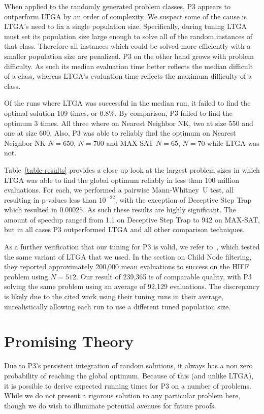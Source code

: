 \documentclass{sig-alternate}
\begin{document}
When applied to the randomly generated problem classes, P3 appears to outperform LTGA
by an order of complexity.  We suspect some of the cause is LTGA's need to fix
a single population size.  Specifically, during tuning LTGA must set its population
size large enough to solve all of the random instances of that class.  Therefore
all instances which could be solved more efficiently with a smaller population size
are penalized.  P3 on the other hand grows with problem difficulty.  As such its
median evaluation time better reflects the median difficult of a class, whereas LTGA's
evaluation time reflects the maximum difficulty of a class.

Of the runs where LTGA was successful in the median run, it failed to find the optimal solution
109 times, or 0.8\%.  By comparison, P3 failed to find the optimum 3 times.  All three
where on Nearest Neighbor NK, two at size 550 and one at size 600.  Also, P3 was able
to reliably find the optimum on Nearest Neighbor NK $N=650$, $N=700$ and MAX-SAT $N=65$, $N=70$
while LTGA was not.

Table~\ref{table-results} provides a close up look at the largest problem sizes
in which LTGA was able to find the global optimum reliably in less than 100 million
evaluations.  For each, we performed a pairwise Mann-Whitney~U test, all resulting
in p-values less than $10^{-22}$, with the exception of Deceptive Step Trap which
resulted in $0.00025$.  As such these results are highly significant.  The amount
of speedup ranged from 1.1 on Deceptive Step Trap to 942 on MAX-SAT, but in all
cases P3 outperformed LTGA and all other comparison techniques.

As a further verification that our tuning for P3 is valid, we refer
to~\cite{thierens:2013:ltgahiff}, which tested the same variant of LTGA that we
used.  In the section on Child Node filtering, they reported approximately 200,000
mean evaluations to success on the HIFF problem using $N=512$.  Our result of
239,365 is of comparable quality, with P3 solving the same problem using an average
of 92,129 evaluations.  The discrepancy is likely due to the cited work using
their tuning runs in their average, unrealistically allowing each run to use a different tuned population size.

\section{Promising Theory}
Due to P3's persistent integration of random solutions, it always has
a non zero probability of reaching the global optimum.  Because of
this (and unlike LTGA), it is possible to derive expected
running times for P3 on a number of problems.  While we do not present
a rigorous solution to any particular problem here, though we do wish to
illuminate potential avenues for future proofs.
\end{document}
